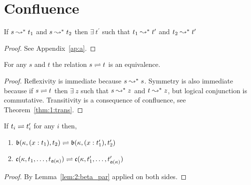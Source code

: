 \section{Confluence}

\begin{lemma}[Confluence]
    If $s \leadsto^* t_1$ and $s \leadsto^* t_2$ then $\exists\ t^\prime$ such that $t_1 \leadsto^* t^\prime$ and $t_2 \leadsto^* t^\prime$
\end{lemma}
\begin{proof}
    See Appendix~\ref{ap:a}.
\end{proof}

\begin{lemma}
    For any $s$ and $t$ the relation $s \rightleftharpoons t$ is an equivalence.
    \label{lem:2:beta_conv_equivalence}
\end{lemma}
\begin{proof}
    Reflexivity is immediate because $s \leadsto^* s$.
    Symmetry is also immediate because if $s \rightleftharpoons t$ then $\exists\ z$ such that $s \leadsto^* z$ and $t \leadsto^* z$, but logical conjunction is commutative.
    Transitivity is a consequence of confluence, see Theorem~\ref{thm:1:trans}.
\end{proof}

\begin{lemma}
    If $t_i \rightleftharpoons t_i^\prime$ for any $i$ then,
    \begin{enumerate}
        \item $\mathfrak{b}(\kappa, (x : t_1), t_2) \rightleftharpoons \mathfrak{b}(\kappa, (x : t_1^\prime), t_2^\prime)$
        \item $\mathfrak{c}(\kappa, t_1,\ldots,t_{\mathfrak{a}(\kappa)}) \rightleftharpoons \mathfrak{c}(\kappa, t_1^\prime,\ldots,t_{\mathfrak{a}(\kappa)}^\prime)$
    \end{enumerate}
    \label{lem:2:conv_congr}
\end{lemma}
\begin{proof}
    By Lemma~\ref{lem:2:beta_par} applied on both sides.
\end{proof}
